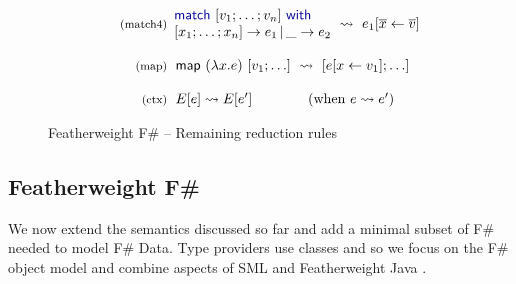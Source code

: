 \documentclass[10pt,preprint,blind,clearpagebib]{sigplanconf}
\newcommand{\kvd}[1]{\textnormal{\textcolor{kvdclr}{\sffamily #1}}}
\newcommand{\ident}[1]{\textnormal{\sffamily #1}}
\newcommand{\reduce}{\rightsquigarrow}
\begin{document}
\begin{figure}
\begin{equation*}
\begin{array}{rl}
 \\
 \textnormal{\footnotesize{(match4)}}&
 \hspace{-1em}
 \begin{array}{l}
  \kvd{match}~[v_1;\ldots;v_n]~\kvd{with} \\[0em]
  [x_1;\ldots;x_n ] \rightarrow e_1 \,|\, \_ \rightarrow e_2
 \end{array} \hspace{-0.5em} ~\reduce~ e_1[\overline{x}\leftarrow\overline{v}] \\
 \\
 \textnormal{\footnotesize{(map)}}&
 \hspace{-0.4em}
 \ident{map}~(\lambda x.e)~[v_1; \ldots] ~\reduce~ [e[x\leftarrow v_1]; \ldots] \\
 \\
 \textnormal{\footnotesize{(ctx)}}&
 \hspace{-0.4em}
  E[e] \reduce E[e'] \qquad\qquad(\textnormal{when}~e \reduce e')\\
\end{array}
\end{equation*}

\caption{Featherweight F\# -- Remaining reduction rules}
\label{fig:ff-reduction}
\end{figure}


\subsection{Featherweight F\#}
\label{sec:formal-ff}

We now extend the semantics discussed so far and add a minimal subset of F\# needed to model F\# 
Data. Type providers use classes and so we focus on the F\# object model and combine aspects of SML 
\cite{sml} and Featherweight Java \cite{fwjava}. 
\end{document}
